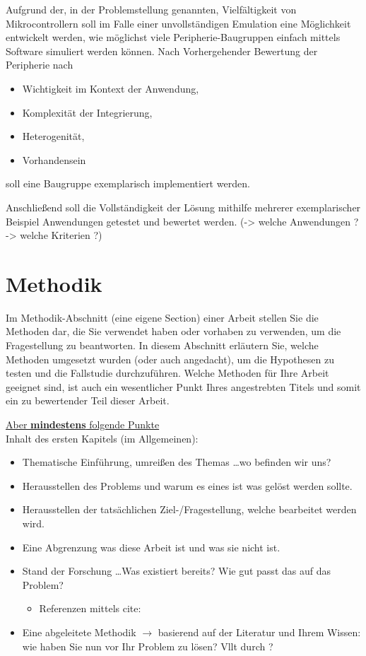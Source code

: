 Aufgrund der, in der Problemstellung genannten, Vielfältigkeit von Mikrocontrollern
soll im Falle einer unvollständigen Emulation eine Möglichkeit entwickelt werden,
wie möglichst viele Peripherie-Baugruppen einfach mittels Software simuliert werden
können.
Nach Vorhergehender Bewertung der Peripherie nach
\begin{itemize}
    \item Wichtigkeit im Kontext der Anwendung,
    \item Komplexität der Integrierung,
    \item Heterogenität,
    \item Vorhandensein
\end{itemize}
soll eine Baugruppe exemplarisch implementiert werden.

Anschließend soll die Vollständigkeit der Lösung mithilfe mehrerer exemplarischer
Beispiel Anwendungen getestet und bewertet werden.
(-> welche Anwendungen ? -> welche Kriterien ?)

\newpage

\section{Methodik}

Im Methodik-Abschnitt (eine eigene Section) einer Arbeit stellen Sie die Methoden dar,
die Sie verwendet haben oder vorhaben zu verwenden, um die Fragestellung zu beantworten. 
In diesem Abschnitt erläutern Sie, welche Methoden umgesetzt wurden (oder auch angedacht),
um die Hypothesen zu testen und die Fallstudie durchzuführen. 
Welche Methoden für Ihre Arbeit geeignet sind, ist auch ein wesentlicher Punkt Ihres
angestrebten Titels und somit ein zu bewertender Teil dieser Arbeit. 

\underline{Aber \textbf{mindestens} folgende Punkte}\\
Inhalt des ersten Kapitels (im Allgemeinen):
\begin{itemize}
    \item Thematische Einführung, umreißen des Themas \dots wo befinden wir uns?
    \item Herausstellen des Problems und warum es eines ist was gelöst werden sollte.
    \item Herausstellen der tatsächlichen Ziel-/Fragestellung, welche bearbeitet werden wird.
    \item Eine Abgrenzung was diese Arbeit ist und was sie nicht ist.
    \item Stand der Forschung \dots Was existiert bereits? Wie gut passt das auf das Problem?
    \begin{itemize}
        \item Referenzen mittels cite: \cite[S.~111]{jsch2011} \cite[S.~27f]{Tane2014}
    \end{itemize}
    \item Eine abgeleitete Methodik $\rightarrow$ basierend auf der Literatur und Ihrem Wissen: wie haben Sie nun vor Ihr Problem zu lösen? Vllt durch \cite{9429985}?
\end{itemize}
